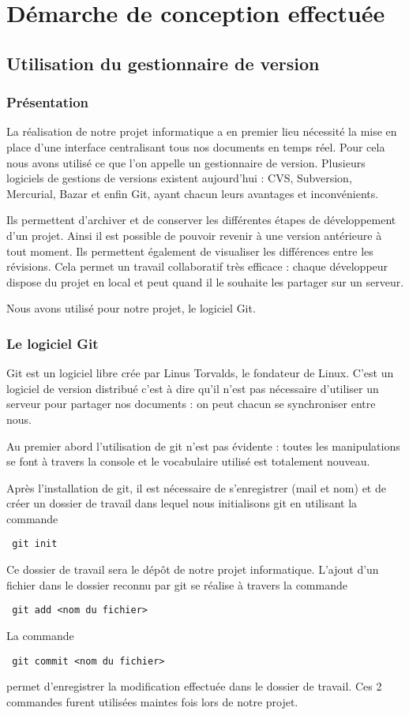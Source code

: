 \chapter{D\'emarche de conception effectu\'ee}
\label{chap:outils utilises}

\section{Utilisation du gestionnaire de version }
\subsection{Pr\'esentation}

La r\'ealisation de notre projet informatique a en premier lieu n\'ecessit\'e la mise en place d'une interface centralisant tous nos
documents en temps r\'eel. Pour cela nous avons utilis\'e ce que l'on appelle un gestionnaire de version. Plusieurs logiciels de gestions 
de versions existent aujourd'hui : CVS, Subversion, Mercurial, Bazar et enfin Git, ayant chacun leurs avantages et inconv\'enients. 

Ils permettent d'archiver et de conserver les diff\'erentes \'etapes de d\'eveloppement d'un projet. Ainsi il est possible de pouvoir revenir
\`a une version ant\'erieure \`a tout moment. Ils permettent \'egalement de visualiser les diff\'erences entre les r\'evisions. Cela permet un  
travail collaboratif tr\`es efficace : chaque d\'eveloppeur dispose du projet en local et peut quand il le souhaite les partager sur un serveur.

Nous avons utilis\'e pour notre projet, le logiciel Git.

\subsection{Le logiciel Git}
Git est un logiciel libre cr\'ee par Linus Torvalds, le fondateur de Linux. C'est un logiciel de version distribu\'e c'est \`a dire qu'il n'est
 pas n\'ecessaire d'utiliser un serveur pour partager nos documents : on peut chacun se synchroniser entre nous.

Au premier abord l'utilisation de git n'est pas \'evidente : toutes les manipulations se font \`a travers la console et le vocabulaire utilis\'e 
est totalement nouveau. 

Apr\`es l'installation de git, il est n\'ecessaire de s'enregistrer (mail et nom) et de cr\'eer un dossier de travail dans lequel nous 
initialisons git en utilisant la commande
\begin{verbatim} git init \end{verbatim}
Ce dossier de travail sera le d\'ep\^ot de notre projet informatique. L'ajout d'un fichier dans le dossier reconnu par git se r\'ealise
 \`a travers la commande
\begin{verbatim} git add <nom du fichier> \end{verbatim}
La commande
\begin{verbatim} git commit <nom du fichier> \end{verbatim} permet d'enregistrer la modification effectu\'ee dans le dossier de travail.
Ces 2 commandes furent utilis\'ees maintes fois lors de notre projet. 

